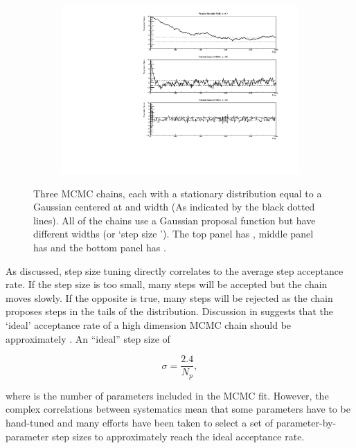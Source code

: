 \begin{figure}[h]
  \begin{subfigure}[t]{\textwidth}
    \includegraphics[width=\textwidth, trim={10mm 0mm 18mm 0mm}, clip,page=1]{Figures/MCMC/MCMCTechnique_StepSizes.pdf}
  \end{subfigure}
  \caption{Three MCMC chains, each with a stationary distribution equal to a Gaussian centered at  and width  (As indicated by the black dotted lines). All of the chains use a Gaussian proposal function but have different widths (or `step size \quickmath{\sigma}'). The top panel has , middle panel has  and the bottom panel has .}
  \label{fig:MCMC_MCTechniqueStepSizeStudy}
\end{figure}

As discussed, step size tuning directly correlates to the average step acceptance rate. If the step size is too small, many steps will be accepted but the chain moves slowly. If the opposite is true, many steps will be rejected as the chain proposes steps in the tails of the distribution. Discussion in \cite{Dunkley2005-xz} suggests that the `ideal' acceptance rate of a high dimension MCMC chain should be approximately . An ``ideal'' step size \cite{Dunkley2005-xz} of

\begin{equation}
  \label{eq:MCMC_IdealStepSize}
  \sigma = \frac{2.4}{N_{p}},
\end{equation}

where  is the number of parameters included in the MCMC fit. However, the complex correlations between systematics mean that some parameters have to be hand-tuned and many efforts have been taken to select a set of parameter-by-parameter step sizes to approximately reach the ideal acceptance rate.


